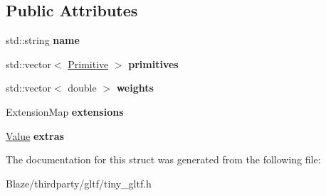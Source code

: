 \subsection*{Public Attributes}
\begin{DoxyCompactItemize}
\item 
\mbox{\label{structtinygltf_1_1Mesh_a7948ce9b98cd43529a961e9b1b6181f4}} 
std\+::string {\bfseries name}
\item 
\mbox{\label{structtinygltf_1_1Mesh_a79c5b0700dae63340f885a06a8e3c5b0}} 
std\+::vector$<$ \hyperlink{structtinygltf_1_1Primitive}{Primitive} $>$ {\bfseries primitives}
\item 
\mbox{\label{structtinygltf_1_1Mesh_a1e01158164cec4caf26e68ba735d1ce3}} 
std\+::vector$<$ double $>$ {\bfseries weights}
\item 
\mbox{\label{structtinygltf_1_1Mesh_af53c84eed5b3c49b21938726d3034524}} 
Extension\+Map {\bfseries extensions}
\item 
\mbox{\label{structtinygltf_1_1Mesh_ae6e5b62a8a9901e91ccd71a3e0287c48}} 
\hyperlink{classtinygltf_1_1Value}{Value} {\bfseries extras}
\end{DoxyCompactItemize}


The documentation for this struct was generated from the following file\+:\begin{DoxyCompactItemize}
\item 
Blaze/thirdparty/gltf/tiny\+\_\+gltf.\+h\end{DoxyCompactItemize}
